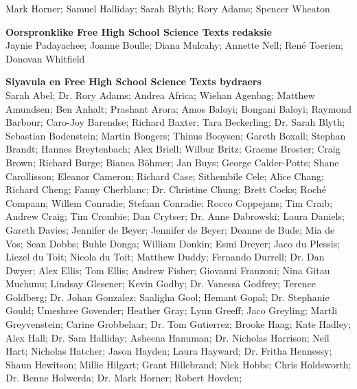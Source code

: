 Mark Horner; Samuel Halliday; Sarah Blyth; Rory Adams; Spencer Wheaton \par 


\textbf{\Large Oorspronklike Free High School Science Texts redaksie}\\

Jaynie Padayachee; Joanne Boulle; Diana Mulcahy; Annette Nell; René Toerien; Donovan Whitfield \par

\textbf{\Large Siyavula en Free High School Science Texts bydraers}\\

    Sarah Abel;
Dr. Rory Adams;
    Andrea Africa;
    Wiehan Agenbag;
    Matthew Amundsen;
    Ben Anhalt;
    Prashant Arora;
    Amos Baloyi;
    Bongani Baloyi;
    Raymond Barbour;
    Caro-Joy Barendse;
    Richard Baxter;
    Tara Beckerling;
Dr. Sarah Blyth;
    Sebastian Bodenstein;
    Martin Bongers;
    Thinus Booysen;
    Gareth Boxall;
    Stephan Brandt;
    Hannes Breytenbach;
    Alex Briell;
    Wilbur Britz;
    Graeme Broster;
    Craig Brown;
    Richard Burge;
    Bianca Böhmer;
    Jan Buys;
    George Calder-Potts;
    Shane Carollisson;
    Eleanor Cameron;
    Richard Case;
    Sithembile Cele;
    Alice Chang;
    Richard Cheng;
    Fanny Cherblanc;
Dr. Christine Chung;
    Brett Cocks;
    Roch\'{e} Compaan;
    Willem Conradie;
    Stefaan Conradie;
    Rocco Coppejans;
    Tim Craib;
    Andrew Craig;
    Tim Crombie;
    Dan Crytser;
Dr. Anne Dabrowski;
    Laura Daniels;
    Gareth Davies;
    Jennifer de Beyer;
    Jennifer de Beyer;
    Deanne de Bude;
    Mia de Vos;
    Sean Dobbs;
    Buhle Donga;
    William Donkin;
    Esmi Dreyer;
    Jaco du Plessis;
    Liezel du Toit;
    Nicola du Toit;
    Matthew Duddy;
    Fernando Durrell;
Dr. Dan Dwyer;
    Alex Ellis;
    Tom Ellis;
    Andrew Fisher;
    Giovanni Franzoni;
    Nina Gitau Muchunu;
    Lindsay Glesener;
    Kevin Godby;
Dr. Vanessa Godfrey;
    Terence Goldberg;
Dr. Johan Gonzalez;
    Saaligha Gool;
    Hemant Gopal;
Dr. Stephanie Gould;
    Umeshree Govender;
    Heather Gray;
    Lynn Greeff;
    Jaco Greyling;
    Martli Greyvenstein;
    Carine Grobbelaar;
Dr. Tom Gutierrez;
    Brooke Haag;
    Kate Hadley;
    Alex Hall;
Dr. Sam Halliday;
    Asheena Hanuman;
Dr. Nicholas Harrison;
    Neil Hart;
    Nicholas Hatcher;
    Jason Hayden;
    Laura Hayward;
Dr. Fritha Hennessy;
    Shaun Hewitson;
    Millie Hilgart;
    Grant Hillebrand;
    Nick Hobbs;
    Chris Holdsworth;
Dr. Benne Holwerda;
Dr. Mark Horner;
    Robert Hovden;
